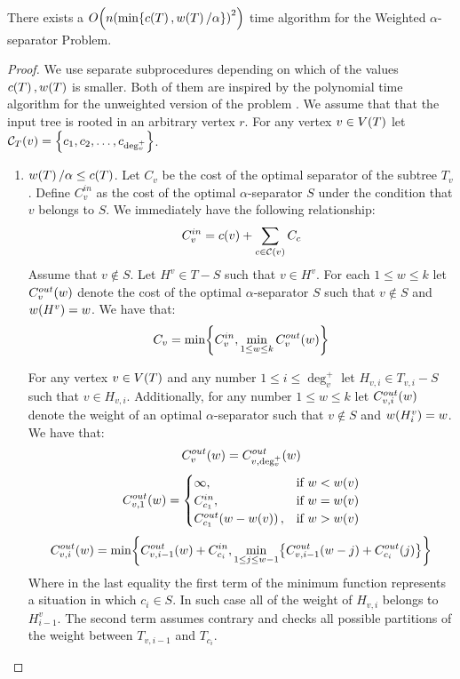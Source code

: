 \begin{theorem}
    There exists a $O\mathopen{}\left( n\mathopen{}\left( \min\mathopen{}\left\{ c\mathopen{}\left( T \right), w\mathopen{}\left( T \right)/\alpha \right\} \right)^2 \right)$ time algorithm for the Weighted $\alpha$-separator Problem.
    \begin{proof}
        We use separate subprocedures depending on which of the values $c\mathopen{}\left( T \right), w\mathopen{}\left( T \right)$ is smaller. Both of them are inspired by the polynomial time algorithm for the unweighted version of the problem \cite{kseparator}. We assume that that the input tree is rooted in an arbitrary vertex $r$. For any vertex $v\in V\mathopen{}\left( T \right)$ let $\mathcal{C}_T\mathopen{}\left( v \right)=\mathopen{}\left\{ c_1,c_2,\dots,c_{\deg_v^+} \right\}$.
        \begin{enumerate}
            \item $w\mathopen{}\left( T \right)/\alpha\leq c\mathopen{}\left( T \right)$. Let $C_{v}$ be the cost of the optimal separator of the subtree $T_v$. Define $C_{v}^{in}$ as the cost of the optimal $\alpha$-separator $S$ under the condition that $v$ belongs to $S$. We immediately have the following relationship:
            $$
            C_{v}^{in} = c\mathopen{}\left( v \right)+\sum_{c\in \mathcal{C}\mathopen{}\left( v \right)}C_{c}
            $$
            Assume that $v\notin S$. Let $H^v\in T-S$ such that $v\in H^v$. For each $1\leq w\leq k$ let $C_v^{out}\mathopen{}\left( w \right)$ denote the cost of the optimal $\alpha$-separator $S$ such that $v\notin S$ and $w\mathopen{}\left( H^v \right) = w$. We have that:
            $$
            C_v = \min\mathopen{}\left\{ C_{v}^{in},\min_{1\leq w\leq k}C_v^{out}\mathopen{}\left( w \right) \right\}
            $$
            
            For any vertex $v\in V\mathopen{}\left( T \right)$ and any number $1\leq i\leq \deg_v^+$ let $H_{v,i}\in T_{v,i}-S$ such that $v\in H_{v,i}$. Additionally, for any number $1\leq w\leq k$ let $C_{v,i}^{out}\mathopen{}\left( w \right)$ denote the weight of an optimal $\alpha$-separator such that $v\notin S$ and $w\mathopen{}\left( H_i^v \right) = w$. We have that: 
            $$
            C_{v}^{out}\mathopen{}\left( w \right)=C_{v,\deg_v^+}^{out}\mathopen{}\left( w \right)
            $$
            $$
            C_{v,1}^{out}\mathopen{}\left( w \right)=\begin{cases}
                \infty, & \text{if } w < w\mathopen{}\left( v \right)\\
                C_{c_1}^{in}, & \text{if } w = w\mathopen{}\left( v \right)\\
                C_{c_1}^{out}\mathopen{}\left( w-w\mathopen{}\left( v \right) \right), & \text{if } w > w\mathopen{}\left( v \right)\\
            \end{cases}
            $$
            $$
            C_{v,i}^{out}\mathopen{}\left( w \right)=\min\mathopen{}\left\{ C_{v,i-1}^{out}\mathopen{}\left( w \right)+C_{c_i}^{in}, \min_{1\leq j\leq w-1}\mathopen{}\left\{ C_{v,i-1}^{out}\mathopen{}\left( w-j \right)+C_{c_i}^{out}\mathopen{}\left( j \right) \right\} \right\}
            $$
            Where in the last equality the  first term of the minimum function represents a situation in which $c_i\in S$. In such case all of the weight of $H_{v, i}$ belongs to $H_{i-1}^v$. The second term assumes contrary and checks all possible partitions of the weight between $T_{v, i-1}$ and $T_{c_i}$.


\end{enumerate}
\end{proof}
\end{theorem}

